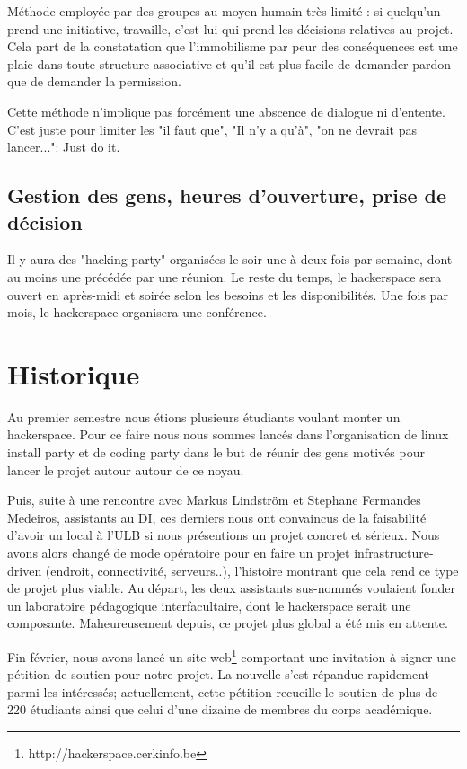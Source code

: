 \documentclass{article}
\begin{document}
Méthode employée par des groupes au moyen humain très limité : si quelqu'un prend 
une initiative, travaille, c'est lui qui prend les décisions relatives au projet. 
Cela part de la constatation que l'immobilisme par peur des conséquences est une 
plaie dans toute structure associative et qu'il est plus facile de demander pardon 
que de demander la permission.

Cette méthode n'implique pas forcément une abscence de dialogue ni d'entente. 
C'est juste pour limiter les "il faut que", "Il n'y a qu'à", "on ne devrait pas lancer...": Just do it.

\subsection{Gestion des gens, heures d'ouverture, prise de décision}

Il y aura des "hacking party" organisées le soir une à deux fois par semaine, dont au moins
une précédée par une réunion.
Le reste du temps, le hackerspace sera ouvert en après-midi et soirée selon les 
besoins et les disponibilités.
Une fois par mois, le hackerspace organisera une conférence.

\newpage
\section{Historique}

Au premier semestre nous étions plusieurs étudiants voulant monter un hackerspace.
Pour ce faire nous nous sommes lancés dans l'organisation de linux install party et
de coding party dans le but de réunir des gens motivés pour lancer le projet autour
autour de ce noyau.

Puis, suite à une rencontre avec Markus Lindström et Stephane Fermandes Medeiros, assistants au DI, ces derniers nous ont convaincus de la faisabilité d'avoir un local à
l'ULB si nous présentions un projet concret et sérieux. Nous avons alors changé de mode
opératoire pour en faire un projet infrastructure-driven (endroit, connectivité, serveurs..),
l'histoire montrant que cela rend ce type de projet plus viable.  Au départ, les deux
assistants  sus-nommés voulaient fonder un laboratoire pédagogique interfacultaire,
dont le hackerspace serait une composante. Maheureusement depuis, ce projet plus
global a été mis en attente.

Fin février, nous avons lancé un site web\footnote{http://hackerspace.cerkinfo.be} comportant
une invitation à signer une pétition de soutien pour notre projet. La nouvelle s'est répandue rapidement parmi les intéressés; actuellement, cette pétition recueille le soutien de plus de 220 étudiants ainsi que celui d'une dizaine de membres du corps académique.
\end{document}
